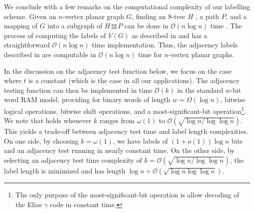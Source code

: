 \documentclass[10pt, conference, compsocconf]{IEEEtran}
\newcommand{\Oh}{\mathcal{O}}
\begin{document}
We conclude with a few remarks on the computational complexity of our labelling scheme.  Given an $n$-vertex planar graph $G$, finding an 8-tree $H$
, a path $P$, and a mapping of $G$ into a subgraph of $H\boxtimes P$ can be done in $\Oh(n\log n)$ time \cite{morin:fast}.  The process of computing the labels of $V(G)$ as described in  and  has a straightforward $\Oh(n\log n)$ time implementation.  Thus, the adjacency labels described in  are computable in $\Oh(n\log n)$ time for $n$-vertex planar graphs.

In the discussion on the adjacency test function below, we focus on the case where $t$ is a constant (which is the case in all our applications).
The adjacency testing function can then be implemented in time $\Oh(k)$  in the standard $w$-bit word RAM model, providing for binary words of length $w = \Omega(\log{n})$, bitwise logical operations, bitwise shift operations, and a most-significant-bit operation\footnote{The only purpose of the most-significant-bit operation is allow decoding of the Elias $\gamma$ code in constant time.}.
We note that  holds whenever $k$ ranges from $\omega(1)$ to $\Oh(\sqrt{\log{n} / \log\log{n}})$. This yields a trade-off between adjacency test time and label length complexities. On one side, by choosing $k = \omega(1)$, we have labels of $(1+o(1))\log{n}$ bits and an adjacency test running in nearly constant time. On the other side, by selecting an adjacency test time complexity of $k = \Oh(\sqrt{\log{n}/\log\log{n}})$, the label length is minimized and has length $\log{n} + \Oh(\sqrt{\log{n}\log\log{n}})$.

%

\end{document}

